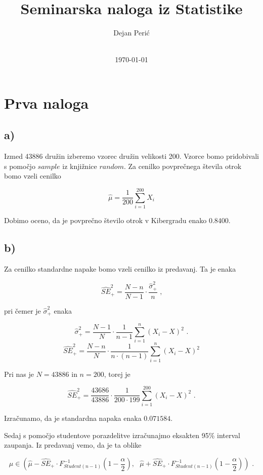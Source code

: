 \documentclass[12pt, a4paper]{article}
\title{Seminarska naloga iz Statistike}
\author{Dejan Perić \\~ \\ }
\date{\today}
\begin{document}

\maketitle




\section*{Prva naloga}
    
\subsection*{a)}

Izmed 43886 družin izberemo vzorec družin velikosti 200. Vzorce bomo pridobivali s pomočjo $sample$ iz knjižnice $random$. Za cenilko povprečnega števila otrok bomo vzeli cenilko

$$\hat{\mu} = \frac{1}{200}\sum^{200}_{i=1} X_i $$

Dobimo oceno, da je povprečno število otrok v Kibergradu enako $0.8400$.

\subsection*{b)}

Za cenilko standardne napake bomo vzeli cenilko iz predavanj. Ta je enaka 

$$ \hat{SE}_+^2 = \frac{N-n}{N-1} \cdot \frac{\hat{\sigma}_+^2}{n} \text{ ,}$$

pri čemer je $\hat{\sigma}_+^2$ enaka 

$$\hat{\sigma}_+^2 = \frac{N-1}{N} \cdot \frac{1}{n-1} \sum_{i=1}^{n} (X_i - X)^2 \text{ .} $$ $$
\hat{SE}_+^2 = \frac{N-n}{N} \cdot \frac{1}{n\cdot(n-1)} \sum_{i=1}^{n} (X_i - X)^2
$$

Pri nas je $ N = 43886 $ in $ n = 200 $, torej je

$$ \hat{SE}_+^2 = \frac{43686}{43886} \cdot \frac{1}{200\cdot199} \sum_{i=1}^{200} (X_i - X)^2 \text{ .}
$$

Izračunamo, da je standardna napaka enaka $ 0.071584 $.

Sedaj s pomočjo studentove porazdelitve izračunajmo eksakten 95\% interval zaupanja.
Iz predavanj vemo, da je ta oblike

$$ \mu \in (\hat{\mu} - \hat{SE}_+ \cdot F^{-1}_{Student(n-1)}(1-\frac{\alpha}{2}), \text{ }\hat{\mu} + \hat{SE}_+ \cdot F^{-1}_{Student(n-1)}(1-\frac{\alpha}{2}) ) \text{ .}
$$
\end{document}
